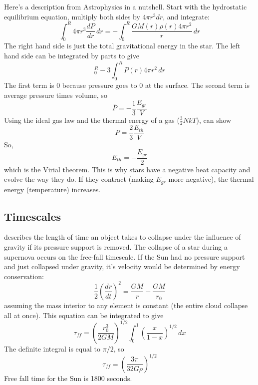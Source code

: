 Here's a description from Astrophysics in a nutshell.  
Start with the hydrostatic equilibrium equation, multiply both sides by $4\pi r^3dr$, and integrate:
\begin{equation}
\int_0^R4\pi r^3\frac{dP}{dr}\,dr = -\int_0^R\frac{GM(r)\rho (r)4\pi r^2}{r}\,dr
\end{equation}
The right hand side is just the total gravitational energy in the star.  The left hand side 
can be integrated by parts to give
\begin{equation}
[P(r)4\pi r^3]_0^R-3\int_0^RP(r)4\pi r^2\,dr
\end{equation}
The first term is 0 because pressure goes to 0 at the surface.  The second term is average 
pressure times volume, so 
\begin{equation}
\bar{P}=-\frac{1}{3}\frac{E_{gr}}{V}
\end{equation}
Using the ideal gas law and the thermal energy of a gas ($\frac{3}{2}NkT$), can show
\begin{equation}
P=\frac{2}{3}\frac{E_{th}}{V}
\end{equation}
So, 
\begin{equation}
\boxed{E_{th}=-\frac{E_{gr}}{2}}
\end{equation}
which is the Virial theorem.  This is why stars have a negative heat capacity and evolve the way 
they do.  If they contract (making $E_{gr}$ more negative), the thermal energy (temperature) 
increases.


\subsection{Timescales}
 describes the length of time an object takes to collapse
under the influence of gravity if its pressure support is removed.  The collapse of a star
during a supernova occurs on the free-fall timescale.
If the Sun had no pressure support and just collapsed under gravity, it's velocity would be 
determined by energy conservation:
\begin{equation}
\frac{1}{2}\left(\frac{dr}{dt}\right)^2 = \frac{GM}{r}-\frac{GM}{r_0}
\end{equation}
assuming the mass interior to any element is constant (the entire cloud collapse all at once).
This equation can be integrated to give
\begin{equation}
\tau_{ff}=\left(\frac{r_0^3}{2GM}\right)^{1/2}\int_0^1\left(\frac{x}{1-x}\right)^{1/2}\,dx
\end{equation}
The definite integral is equal to $\pi/2$, so
\begin{equation}\boxed{
\tau_{ff}=\left(\frac{3\pi}{32G\rho}\right)^{1/2}
}\end{equation}
Free fall time for the Sun is 1800 seconds.

